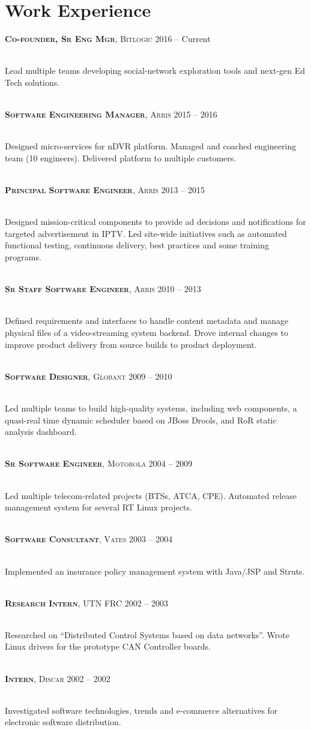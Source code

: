 \documentclass[10pt]{article}
\newcommand \jobdesc[4] {%
	{{\raggedright \large \textbf{\textsc{#1}}, \normalsize\textsc{#2} \hfill \normalsize{\textsc #3 -- #4}}}
}
\begin{document}
\begin{minipage}[t]{0.48\textwidth}
\section{Work Experience} 
\jobdesc{Co-founder, Sr Eng Mgr}{Bitlogic}{2016}{Current}\\
\normalsize{Lead multiple teams developing social-network exploration tools and next-gen Ed Tech solutions.}\\
\\
\jobdesc{Software Engineering Manager}{Arris}{2015}{2016}\\
\normalsize{Designed micro-services for nDVR platform. Managed and coached engineering team (10 engineers). Delivered platform to multiple customers.}\\
\\
\jobdesc{Principal Software Engineer}{Arris}{2013}{2015}\\
\normalsize{Designed mission-critical components to provide ad decisions and notifications for targeted advertisement in IPTV. Led site-wide initiatives such as automated functional testing, continuous delivery, best practices and some training programs.}\\
\\
\jobdesc{Sr Staff Software Engineer}{Arris}{2010}{2013}\\
\normalsize{Defined requirements and interfaces to handle content metadata and manage physical files of a video-streaming system backend. Drove internal changes to improve product delivery from source builds to product deployment.}\\
\\
\jobdesc{Software Designer}{Globant}{2009}{2010}\\
\normalsize{Led multiple teams to build high-quality systems, including web components, a quasi-real time dynamic scheduler based on JBoss Drools, and RoR static analysis dashboard.}\\
\\
\jobdesc{Sr Software Engineer}{Motorola}{2004}{2009}\\
\normalsize{Led multiple telecom-related projects (BTSs, ATCA, CPE). Automated release management system for several RT Linux projects.}\\
\\
\jobdesc{Software Consultant}{Vates}{2003}{2004}\\
\normalsize{Implemented an insurance policy management system with Java/JSP and Struts.}\\
\\
\jobdesc{Research Intern}{UTN FRC}{2002}{2003}\\
\normalsize{Researched on “Distributed Control Systems based on data networks”. Wrote Linux drivers for the prototype CAN Controller boards.}\\
\\
\jobdesc{Intern}{Discar}{2002}{2002}\\
\normalsize{Investigated software technologies, trends and e-commerce alternatives for electronic software distribution.}


\end{minipage}
\end{document}
